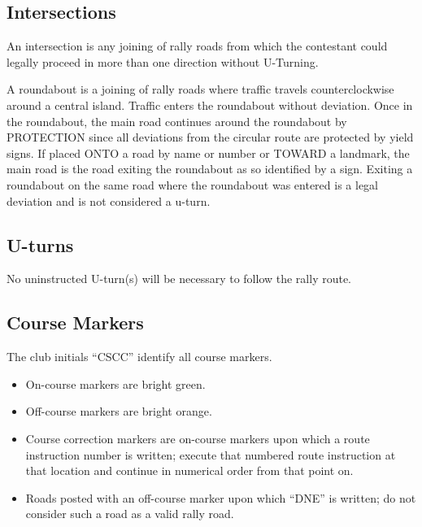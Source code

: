 \subsection{Intersections}
An intersection is any joining of rally roads from which the contestant could legally proceed in more than one direction without U-Turning.

A roundabout is a joining of rally roads where traffic travels counterclockwise around a central island.  Traffic enters the roundabout without deviation.  Once in the roundabout, the main road continues around the roundabout by PROTECTION since all deviations from the circular route are protected by yield signs.  If placed ONTO a road by name or number or TOWARD a landmark, the main road is the road exiting the roundabout as so identified by a sign.  Exiting a roundabout on the same road where the roundabout was entered is a legal deviation and is not considered a u-turn.

\subsection{U-turns}
No uninstructed U-turn(s) will be necessary to follow the rally route.

\subsection{Course Markers}
The club initials ``CSCC'' identify all course markers.

\begin{itemize}

\item On-course markers are bright green.

\item Off-course markers are bright orange.

\item Course correction markers are on-course markers upon which a route instruction number is written; execute that numbered route instruction at that location and continue in numerical order from that point on.

\item Roads posted with an off-course marker upon which ``DNE'' is written; do not consider such a road as a valid rally road.

\end{itemize}
